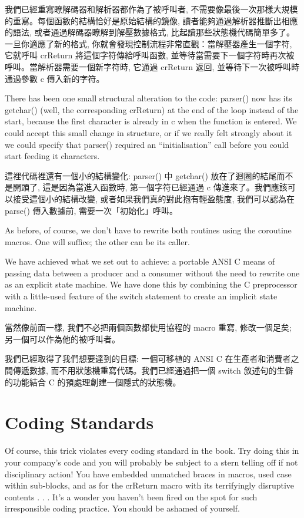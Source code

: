 \documentclass[12pt]{article}
\begin{document}
\begin{CJK}{UTF8}{bsmi}
我們已經重寫瞭解碼器和解析器都作為了被呼叫者, 不需要像最後一次那樣大規模的重寫。每個函數的結構恰好是原始結構的鏡像, 讀者能夠通過解析器推斷出相應的語法, 或者通過解碼器瞭解到解壓數據格式, 比起讀那些狀態機代碼簡單多了。一旦你適應了新的格式, 你就會發現控制流程非常直觀：當解壓器產生一個字符, 它就呼叫 crReturn 將這個字符傳給呼叫函數, 並等待當需要下一個字符時再次被呼叫。當解析器需要一個新字符時, 它通過
crReturn 返回, 並等待下一次被呼叫時通過參數 c 傳入新的字符。

There has been one small structural alteration to the code: parser() now has its getchar() (well, the corresponding crReturn) at the end of the loop instead of the start, because the first character is already in c when the function is entered. We could accept this small change in structure, or if we really felt strongly about it we could specify that parser() required an ``initialisation'' call before you could start feeding it characters.

這裡代碼裡還有一個小的結構變化: parser() 中 getchar() 放在了迴圈的結尾而不是開頭了, 這是因為當進入函數時, 第一個字符已經通過 c
傳進來了。我們應該可以接受這個小的結構改變, 或者如果我們真的對此抱有輕盈態度, 我們可以認為在 parse()
傳入數據前, 需要一次「初始化」呼叫。 

As before, of course, we don't have to rewrite both routines using the coroutine macros. One will suffice; the other can be its caller.

We have achieved what we set out to achieve: a portable ANSI C means of passing data between a producer and a consumer without the need to rewrite one as an explicit state machine. We have done this by combining the C preprocessor with a little-used feature of the switch statement to create an implicit state machine.

當然像前面一樣, 我們不必把兩個函數都使用協程的 macro 重寫, 修改一個足矣; 另一個可以作為他的被呼叫者。

我們已經取得了我們想要達到的目標: 一個可移植的 ANSI C 在生產者和消費者之間傳遞數據, 而不用狀態機重寫代碼。我們已經通過把一個
switch 敘述句的生僻的功能結合 C 的預處理創建一個隱式的狀態機。 

\section{Coding Standards}

Of course, this trick violates every coding standard in the book. Try doing this in your company's code and you will probably be subject to a stern telling off if not disciplinary action! You have embedded unmatched braces in macros, used case within sub-blocks, and as for the crReturn macro with its terrifyingly disruptive contents . . . It's a wonder you haven't been fired on the spot for such irresponsible coding practice. You should be ashamed of yourself.


\end{CJK}
\end{document}
